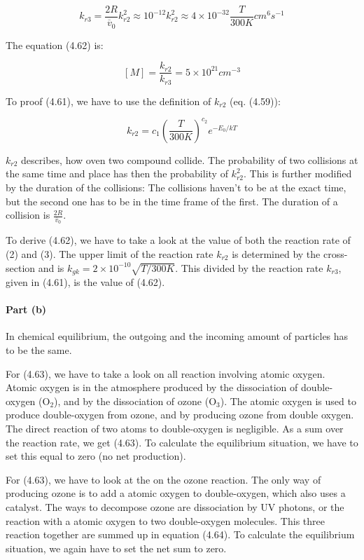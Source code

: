 \documentclass[12pt,a4paper]{article}
\begin{document}
$$k_{r3} = \frac{2 R}{\overline{v}_0} k_{r2}^2 \approx 10^{-12} k_{r2}^2 \approx 4 \times 10^{-32} \frac{T}{300 K} cm^6 s^{-1}$$

The equation (4.62) is:

$$[M] = \frac{k_{r2}}{k_{r3}} = 5 \times 10^{21} cm^{-3}$$

To proof (4.61), we have to use the definition of $k_{r2}$ (eq. (4.59)):

$$k_{r2} = c_1 \left(\frac{T}{300 K}\right)^{c_2} e^{-E_0 / kT}$$

$k_{r2}$ describes, how oven two compound collide. The probability of two collisions at the same time and place has then the probability of $k_{r2}^2$. This is further modified by the duration of the collisions: The collisions haven't to be at the exact time, but the second one has to be in the time frame of the first. The duration of a collision is $\frac{2 R}{\overline{v}_0}$.

To derive (4.62), we have to take a look at the value of both the reaction rate of (2) and (3). The upper limit of the reaction rate $k_{r2}$ is determined by the cross-section and is $k_{gk} = 2 \times 10^{-10} \sqrt{T/300K}$. This divided by the reaction rate $k_{r3}$, given in (4.61), is the value of (4.62).

\paragraph{Part (b)}

In chemical equilibrium, the outgoing and the incoming amount of particles has to be the same. 

For (4.63), we have to take a look on all reaction involving atomic oxygen. Atomic oxygen is in the atmosphere produced by the dissociation of double-oxygen (O${}_2$), and by the dissociation of ozone (O${}_3$). The atomic oxygen is used to produce double-oxygen from ozone, and by producing ozone from double oxygen. The direct reaction of two atoms to double-oxygen is negligible. As a sum over the reaction rate, we get (4.63). To calculate the equilibrium situation, we have to set this equal to zero (no net production).

For (4.63), we have to look at the on the ozone reaction. The only way of producing ozone is to add a atomic oxygen to double-oxygen, which also uses a catalyst. The ways to decompose ozone are dissociation by UV photons, or the reaction with a atomic oxygen to two double-oxygen molecules. This three reaction together are summed up in equation (4.64). To calculate the equilibrium situation, we again have to set the net sum to zero.
\end{document}
